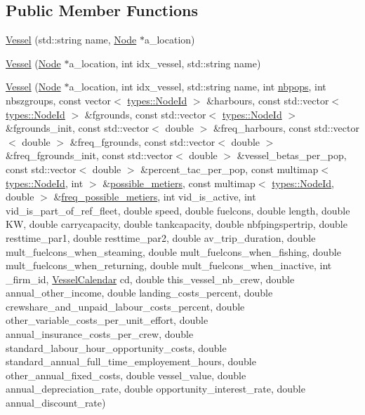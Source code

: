\subsection*{Public Member Functions}
\begin{DoxyCompactItemize}
\item 
\mbox{\hyperlink{class_vessel_a209a31912f7c211e904c4d97f8895eba}{Vessel}} (std\+::string name, \mbox{\hyperlink{class_node}{Node}} $\ast$a\+\_\+location)
\item 
\mbox{\hyperlink{class_vessel_a86027d1160c0c099d8766a28301b6702}{Vessel}} (\mbox{\hyperlink{class_node}{Node}} $\ast$a\+\_\+location, int idx\+\_\+vessel, std\+::string name)
\item 
\mbox{\hyperlink{class_vessel_a3310b381af95e960f57ca2a1e2b6b469}{Vessel}} (\mbox{\hyperlink{class_node}{Node}} $\ast$a\+\_\+location, int idx\+\_\+vessel, std\+::string name, int \mbox{\hyperlink{thread__vessels_8cpp_a664e1cfcbba8af93cd65eaeb74e3b3a5}{nbpops}}, int nbszgroups, const vector$<$ \mbox{\hyperlink{classtypes_1_1_node_id}{types\+::\+Node\+Id}} $>$ \&harbours, const std\+::vector$<$ \mbox{\hyperlink{classtypes_1_1_node_id}{types\+::\+Node\+Id}} $>$ \&fgrounds, const std\+::vector$<$ \mbox{\hyperlink{classtypes_1_1_node_id}{types\+::\+Node\+Id}} $>$ \&fgrounds\+\_\+init, const std\+::vector$<$ double $>$ \&freq\+\_\+harbours, const std\+::vector$<$ double $>$ \&freq\+\_\+fgrounds, const std\+::vector$<$ double $>$ \&freq\+\_\+fgrounds\+\_\+init, const std\+::vector$<$ double $>$ \&vessel\+\_\+betas\+\_\+per\+\_\+pop, const std\+::vector$<$ double $>$ \&percent\+\_\+tac\+\_\+per\+\_\+pop, const multimap$<$ \mbox{\hyperlink{classtypes_1_1_node_id}{types\+::\+Node\+Id}}, int $>$ \&\mbox{\hyperlink{thread__vessels_8cpp_ace8fe298fa5b261860011b940c780864}{possible\+\_\+metiers}}, const multimap$<$ \mbox{\hyperlink{classtypes_1_1_node_id}{types\+::\+Node\+Id}}, double $>$ \&\mbox{\hyperlink{thread__vessels_8cpp_a13745fb14a977ff63e4edd32bc4f3898}{freq\+\_\+possible\+\_\+metiers}}, int vid\+\_\+is\+\_\+active, int vid\+\_\+is\+\_\+part\+\_\+of\+\_\+ref\+\_\+fleet, double speed, double fuelcons, double length, double KW, double carrycapacity, double tankcapacity, double nbfpingspertrip, double resttime\+\_\+par1, double resttime\+\_\+par2, double av\+\_\+trip\+\_\+duration, double mult\+\_\+fuelcons\+\_\+when\+\_\+steaming, double mult\+\_\+fuelcons\+\_\+when\+\_\+fishing, double mult\+\_\+fuelcons\+\_\+when\+\_\+returning, double mult\+\_\+fuelcons\+\_\+when\+\_\+inactive, int \+\_\+firm\+\_\+id, \mbox{\hyperlink{struct_vessel_calendar}{Vessel\+Calendar}} cd, double this\+\_\+vessel\+\_\+nb\+\_\+crew, double annual\+\_\+other\+\_\+income, double landing\+\_\+costs\+\_\+percent, double crewshare\+\_\+and\+\_\+unpaid\+\_\+labour\+\_\+costs\+\_\+percent, double other\+\_\+variable\+\_\+costs\+\_\+per\+\_\+unit\+\_\+effort, double annual\+\_\+insurance\+\_\+costs\+\_\+per\+\_\+crew, double standard\+\_\+labour\+\_\+hour\+\_\+opportunity\+\_\+costs, double standard\+\_\+annual\+\_\+full\+\_\+time\+\_\+employement\+\_\+hours, double other\+\_\+annual\+\_\+fixed\+\_\+costs, double vessel\+\_\+value, double annual\+\_\+depreciation\+\_\+rate, double opportunity\+\_\+interest\+\_\+rate, double annual\+\_\+discount\+\_\+rate)

\end{DoxyCompactItemize}
